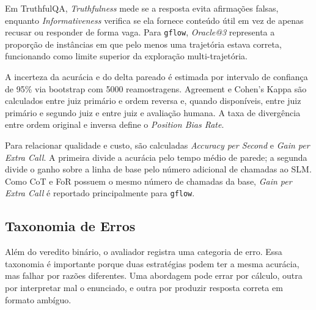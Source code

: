 \documentclass[12pt]{article}
\begin{document}
Em TruthfulQA, \textit{Truthfulness} mede se a resposta evita afirmações falsas, enquanto \textit{Informativeness} verifica se ela fornece conteúdo útil em vez de apenas recusar ou responder de forma vaga. Para \texttt{gflow}, \textit{Oracle@3} representa a proporção de instâncias em que pelo menos uma trajetória estava correta, funcionando como limite superior da exploração multi-trajetória.

A incerteza da acurácia e do delta pareado é estimada por intervalo de confiança de 95\% via bootstrap com 5000 reamostragens. Agreement e Cohen's Kappa são calculados entre juiz primário e ordem reversa e, quando disponíveis, entre juiz primário e segundo juiz e entre juiz e avaliação humana. A taxa de divergência entre ordem original e inversa define o \textit{Position Bias Rate}.

Para relacionar qualidade e custo, são calculadas \textit{Accuracy per Second} e \textit{Gain per Extra Call}. A primeira divide a acurácia pelo tempo médio de parede; a segunda divide o ganho sobre a linha de base pelo número adicional de chamadas ao SLM. Como CoT e FoR possuem o mesmo número de chamadas da base, \textit{Gain per Extra Call} é reportado principalmente para \texttt{gflow}.

\subsection{Taxonomia de Erros}

Além do veredito binário, o avaliador registra uma categoria de erro. Essa taxonomia é importante porque duas estratégias podem ter a mesma acurácia, mas falhar por razões diferentes. Uma abordagem pode errar por cálculo, outra por interpretar mal o enunciado, e outra por produzir resposta correta em formato ambíguo.
\end{document}
